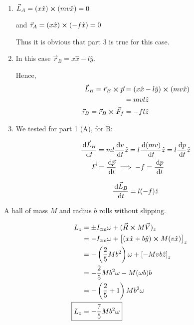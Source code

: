 \begin{sol}
	\begin{enumerate}
		\item $\vec L_A = (x \hat x) \cross (mv \hat x) = 0$
		
		and $\vec \tau_A = (x \hat x) \cross (- f \hat x) = 0$

		Thus it is obvious that part 3 is true for this case.

		\item In this case $\vec r_B = x \hat x - l \hat y$.

		Hence, 
		\begin{align}
			\vec L_B = \vec r_B \cross \vec p &= (x \hat x - l \hat y) \cross (mv \hat x)\\
			&= mvl\hat z\\
			\vec \tau_B = \vec r_B \cross \vec F_f &= - fl \hat z
		\end{align}

		\item We tested for part 1 (A), for B:
		
		\begin{align}
			\frac{\D \vec L_B}{\D t} &= ml \frac{\D v}{\D t} \hat z = l \frac{\D (mv)}{\D t} \hat z = l \frac{\D p}{\D t} \hat z\\
			\vec F &= \frac{\D \vec p}{\D t} \implies - f = \frac{\D p}{\D t}
		\end{align}

		\begin{equation}
			\frac{\D \vec L_B}{\D t} = l (-f) \hat z
		\end{equation}
	\end{enumerate}
\end{sol}


\begin{example}
	A ball of mass $M$ and radius $b$ rolls without slipping.
\end{example}

\begin{sol}
	\begin{align}
		L_z &= \pm I_\mathrm{cm} \omega + (\vec R \cross M\vec V)_z\\
		&=  - I_\mathrm{cm} \omega + \left[(x \hat x + b \hat y) \cross M (v \hat x)\right]_z\\
		&= - \left(\frac{2}{5} Mb^2\right) \omega + \left[-Mvb \hat z\right]_z\\
		&= - \frac{2}{5} Mb^2 \omega - M(\omega b) b\\
		&= -\left(\frac{2}{5} + 1\right) Mb^2\omega\\
		\Aboxed{L_z &= - \frac{7}{5} Mb^2 \omega}
	\end{align}
\end{sol}

